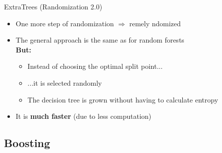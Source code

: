 \begin{frame}[plain]{}{}
	
\end{frame}


\begin{frame}{ExtraTrees (Randomization 2.0)}{}
	\begin{itemize}
		\item One more step of randomization
			$\Rightarrow$ remely ndomized 
		\item The general approach is the same as for random forests \\
		\textbf{But:}
		\begin{itemize}
			\item Instead of choosing the optimal split point...
			\item ...it is selected randomly
			\item The decision tree is grown without having to calculate entropy
		\end{itemize}
		\item It is \textbf{much faster} (due to less computation)
	\end{itemize}

	\begin{boxBlueNoFrame}
	\end{boxBlueNoFrame}
\end{frame}


\subsection{Boosting}

